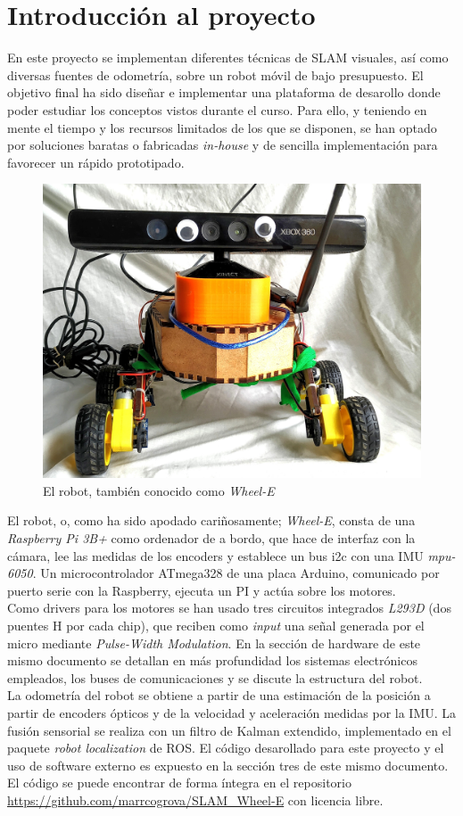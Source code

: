 \documentclass[a4paper,twoside]{article}
\begin{document}
\section{Introducción al proyecto}
En este proyecto se implementan diferentes técnicas de SLAM visuales, así como diversas fuentes de odometría, sobre un robot móvil de bajo presupuesto. El objetivo final ha
sido diseñar e implementar una plataforma de desarollo donde poder estudiar los conceptos vistos durante el curso. Para ello, y teniendo en mente el tiempo y los recursos 
limitados de los que se disponen, se han optado por soluciones baratas o fabricadas \textit{in-house} y de sencilla implementación para favorecer un rápido prototipado.
\begin{figure}[h!]
	\centering
	\includegraphics[width=.6\textwidth]{images/wheele_real}
	\caption{El robot, también conocido como \textit{Wheel-E}}
\end{figure}

El robot, o, como ha sido apodado cariñosamente; \textit{Wheel-E}, consta de una \textit{Raspberry Pi 3B+} como ordenador de a bordo, que hace de interfaz con la cámara, lee 
las medidas de los encoders y establece un bus i2c con una IMU \textit{mpu-6050}. Un microcontrolador ATmega328 de una placa Arduino, comunicado por puerto serie con la
Raspberry, ejecuta un PI y actúa sobre los motores.\\


Como drivers para los motores se han usado tres circuitos integrados \textit{L293D} (dos puentes H por cada chip), que reciben como \textit{input}
una señal generada por el micro mediante \textit{Pulse-Width Modulation}. En la sección de hardware de este mismo documento se detallan en más profundidad los sistemas
electrónicos empleados, los buses de comunicaciones y se discute la estructura del robot.\\
La odometría del robot se obtiene a partir de una estimación de la posición a partir de encoders ópticos y de la velocidad y aceleración medidas por la IMU. La fusión
sensorial se realiza con un filtro de Kalman extendido, implementado en el paquete \textit{robot localization} de ROS. El código desarollado para este proyecto y el uso de 
software externo es expuesto en la sección tres de este mismo documento. El código se puede encontrar de forma íntegra en el repositorio \url{https://github.com/marrcogrova/SLAM_Wheel-E} con licencia libre.\\
\end{document}
